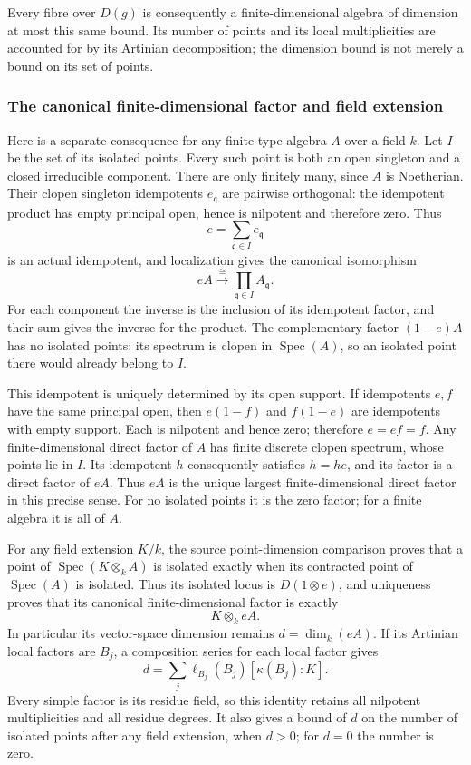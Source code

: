Every fibre over \(D(g)\) is consequently a finite-dimensional algebra of dimension at most this same bound. Its number of points and its local multiplicities are accounted for by its Artinian decomposition; the dimension bound is not merely a bound on its set of points.

\subsubsection{The canonical finite-dimensional factor and field extension}\label{algebra-proof-031-the-canonical-finite-dimensional-factor-and-field-extension}

Here is a separate consequence for any finite-type algebra \(A\) over a field \(k\). Let \(I\) be the set of its isolated points. Every such point is both an open singleton and a closed irreducible component. There are only finitely many, since \(A\) is Noetherian. Their clopen singleton idempotents \(e_{\mathfrak q}\) are pairwise orthogonal: the idempotent product has empty principal open, hence is nilpotent and therefore zero. Thus \[
 e=\sum_{\mathfrak q\in I}e_{\mathfrak q}
\] is an actual idempotent, and localization gives the canonical isomorphism \[
 eA\xrightarrow{\cong}\prod_{\mathfrak q\in I}A_{\mathfrak q}.
\] For each component the inverse is the inclusion of its idempotent factor, and their sum gives the inverse for the product. The complementary factor \((1-e)A\) has no isolated points: its spectrum is clopen in \(\operatorname{Spec}(A)\), so an isolated point there would already belong to \(I\).

This idempotent is uniquely determined by its open support. If idempotents \(e,f\) have the same principal open, then \(e(1-f)\) and \(f(1-e)\) are idempotents with empty support. Each is nilpotent and hence zero; therefore \(e=ef=f\). Any finite-dimensional direct factor of \(A\) has finite discrete clopen spectrum, whose points lie in \(I\). Its idempotent \(h\) consequently satisfies \(h=he\), and its factor is a direct factor of \(eA\). Thus \(eA\) is the unique largest finite-dimensional direct factor in this precise sense. For no isolated points it is the zero factor; for a finite algebra it is all of \(A\).

For any field extension \(K/k\), the source point-dimension comparison proves that a point of \(\operatorname{Spec}(K\otimes_k A)\) is isolated exactly when its contracted point of \(\operatorname{Spec}(A)\) is isolated. Thus its isolated locus is \(D(1\otimes e)\), and uniqueness proves that its canonical finite-dimensional factor is exactly \[
 K\otimes_k eA.
\] In particular its vector-space dimension remains \(d=\dim_k(eA)\). If its Artinian local factors are \(B_j\), a composition series for each local factor gives \[
 d=\sum_j\ell_{B_j}(B_j)[\kappa(B_j):K].
\] Every simple factor is its residue field, so this identity retains all nilpotent multiplicities and all residue degrees. It also gives a bound of \(d\) on the number of isolated points after any field extension, when \(d>0\); for \(d=0\) the number is zero.

